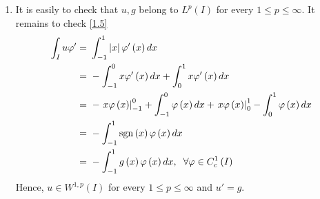 \documentclass[a4paper,oneside]{article}
\numberwithin{equation}{section}
\begin{document}
\begin{enumerate}
\item It is easily to check that $u,g$ belong to $L^p\left(I\right)$ for every $1\le p\le \infty$. It remains to check \eqref{1.5}
\begin{align}
\int_I {u\varphi '}  =&\ \int_{ - 1}^1 {\left| x \right|\varphi '\left( x \right)dx} \\
 =&\  - \int_{ - 1}^0 {x\varphi '\left( x \right)dx}  + \int_0^1 {x\varphi '\left( x \right)dx} \\
 =&\  - \left. {x\varphi \left( x \right)} \right|_{ - 1}^0 + \int_{ - 1}^0 {\varphi \left( x \right)dx}  + \left. {x\varphi \left( x \right)} \right|_0^1 - \int_0^1 {\varphi \left( x \right)dx} \\
 =&\  - \int_{ - 1}^1 {{\mathop{\rm sgn}} \left( x \right)\varphi \left( x \right)dx} \\
 =&\  - \int_{ - 1}^1 {g\left( x \right)\varphi \left( x \right)dx} ,\hspace{0.2cm}\forall \varphi  \in C_c^1\left( I \right)
\end{align}
Hence, $u \in {W^{1,p}}\left( I \right)$ for every $1\le p\le \infty$ and $u'=g$.


\end{enumerate}
\end{document}
